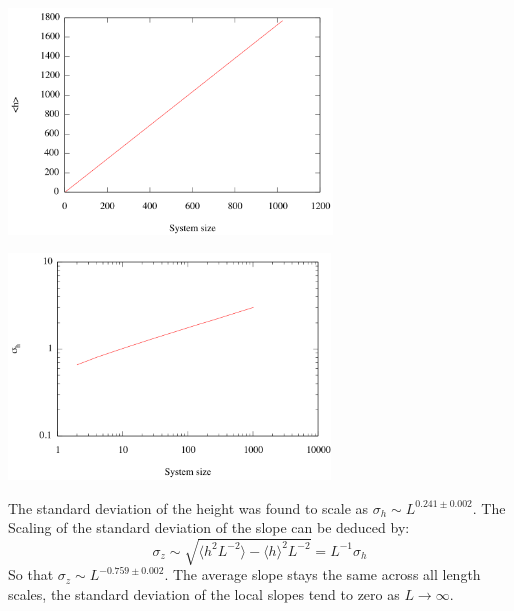 \documentclass[twoside]{article}
\begin{document}
\begin{multicols}{2}
\begin{center}
  \includegraphics[height=60mm]{mvl.png}
\end{center}
\begin{center}
  \includegraphics[height=60mm]{svl.png}
\end{center}
\end{multicols}
The standard deviation of the height was found to scale as $\sigma_h \sim L^{0.241 \pm 0.002}$. The Scaling of the standard deviation of the slope can be deduced by:
\[
\sigma_z \sim \sqrt{\langle h^2 L^{-2} \rangle - \langle h \rangle^2  L^{-2}} = L^{-1} \sigma_h
\]
So that $\sigma_z \sim  L^{-0.759 \pm 0.002}$. The average slope stays the same across all length scales, the standard deviation of the local slopes tend to zero as $L \to \infty$.
\end{document}
